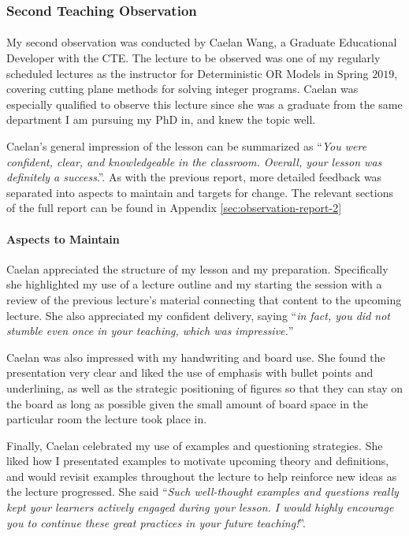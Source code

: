 \documentclass{article}
\begin{document}
\subsubsection*{Second Teaching Observation}
\paragraph{}My second observation was conducted by Caelan Wang, a Graduate Educational Developer with the CTE. The lecture to be observed was one of my regularly scheduled lectures as the instructor for Deterministic OR Models in Spring $2019$, covering cutting plane methods for solving integer programs. Caelan was especially qualified to observe this lecture since she was a graduate from the same department I am pursuing my PhD in, and knew the topic well.

Caelan's general impression of the lesson can be summarized as ``\emph{You were confident, clear, and
knowledgeable in the classroom. Overall, your lesson was definitely a success}.''. As with the previous report, more detailed feedback was separated into aspects to maintain and targets for change. The relevant sections of the full report can be found in Appendix \ref{sec:observation-report-2}
\paragraph{Aspects to Maintain}
Caelan appreciated the structure of my lesson and my preparation. Specifically she highlighted my use of a lecture outline and my starting the session with a review of the previous lecture's material connecting that content to the upcoming lecture. She also appreciated my confident delivery, saying ``\emph{in fact, you did not stumble even once in your teaching, which was impressive.}''

Caelan was also impressed with my handwriting and board use. She found the presentation very clear and liked the use of emphasis with bullet points and underlining, as well as the strategic positioning of figures so that they can stay on the board as long as possible given the small amount of board space in the particular room the lecture took place in.

Finally, Caelan celebrated my use of examples and questioning strategies. She liked how I presentated examples to motivate upcoming theory and definitions, and would revisit examples throughout the lecture to help reinforce new ideas as the lecture progressed. She said ``\emph{Such well-thought examples and questions really kept your learners actively engaged during your lesson. I would highly encourage you to continue these
great practices in your future teaching!}''.
\end{document}

